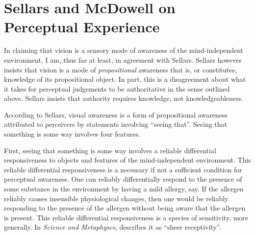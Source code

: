 \documentclass[12pt]{article}
\begin{document}

\section{Sellars and McDowell on Perceptual Experience} %
\label{sec:mcdowell_on_sellars_on_perception}

In claiming that vision is a sensory mode of awareness of the mind-independent environment, I am, thus far at least, in agreement with Sellars. Sellars however insists that vision is a mode of \emph{propositional} awareness that is, or constitutes, knowledge of its propositional object. In part, this is a disagreement about what it takes for perceptual judgements to be authoritative in the sense outlined above. Sellars insists that authority requires knowledge, not knowledgeableness.  %

According to Sellars, visual awareness is a form of propositional awareness attributed to perceivers by statements involving ``seeing that''. Seeing that something is some way involves four features.

First, seeing that something is some way involves a reliable differential responsiveness to objects and features of the mind-independent environment. This reliable differential responsiveness is a necessary if not a sufficient condition for perceptual awareness. One can reliably differentially respond to the presence of some substance in the environment by having a mild allergy, say. If the allergen reliably causes insensible physiological changes, then one would be reliably responding to the presence of the allergen without being aware that the allergen is present. This reliable differential responsiveness is a species of sensitivity, more generally. In \emph{Science and Metaphyscs}, \citet[4]{Sellars:1967uq} describes it as ``sheer receptivity''.
\end{document}
